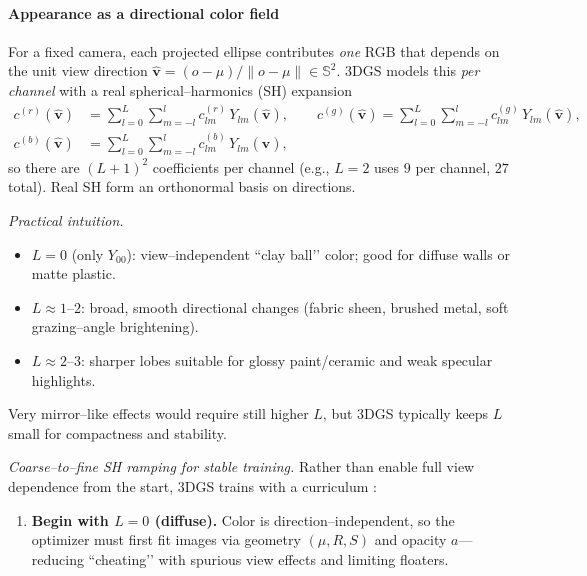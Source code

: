 \begin{enrichment}
\begin{enrichment}
\begin{enrichment}
        \paragraph{Appearance as a directional color field}
        For a fixed camera, each projected ellipse contributes \emph{one} RGB that depends on the unit view direction $\hat{\mathbf v}=(o-\mu)/\|o-\mu\|\in\mathbb{S}^2$. 3DGS models this \emph{per channel} with a real spherical–harmonics (SH) expansion
        \[
        \begin{aligned}
            c^{(r)}(\hat{\mathbf v})&=\sum_{l=0}^{L}\sum_{m=-l}^{l} c^{(r)}_{lm}\,Y_{lm}(\hat{\mathbf v}),\qquad
            c^{(g)}(\hat{\mathbf v})=\sum_{l=0}^{L}\sum_{m=-l}^{l} c^{(g)}_{lm}\,Y_{lm}(\hat{\mathbf v}),\\
            c^{(b)}(\hat{\mathbf v})&=\sum_{l=0}^{L}\sum_{m=-l}^{l} c^{(b)}_{lm}\,Y_{lm}(\hat{\mathbf v}),
        \end{aligned}
        \]
        so there are $(L{+}1)^2$ coefficients per channel (e.g., $L{=}2$ uses $9$ per channel, $27$ total). Real SH form an orthonormal basis on directions.
        
        \noindent\textit{Practical intuition.}
        \begin{itemize}
            \item $L{=}0$ (only $Y_{00}$): view–independent “clay ball’’ color; good for diffuse walls or matte plastic.
            \item $L{\approx}1\text{–}2$: broad, smooth directional changes (fabric sheen, brushed metal, soft grazing–angle brightening).
            \item $L{\approx}2\text{–}3$: sharper lobes suitable for glossy paint/ceramic and weak specular highlights.
        \end{itemize}
        Very mirror–like effects would require still higher $L$, but 3DGS typically keeps $L$ small for compactness and stability.
        
        \noindent\textit{Coarse–to–fine SH ramping for stable training.}
        Rather than enable full view dependence from the start, 3DGS trains with a curriculum \cite{kerbl2023_3dgaussiansplatting}:
        \begin{enumerate}
            \item \textbf{Begin with $L{=}0$ (diffuse).} Color is direction–independent, so the optimizer must first fit images via geometry $(\mu,R,S)$ and opacity $a$—reducing “cheating’’ with spurious view effects and limiting floaters.
            

\end{enumerate}
\end{enrichment}
\end{enrichment}
\end{enrichment}
